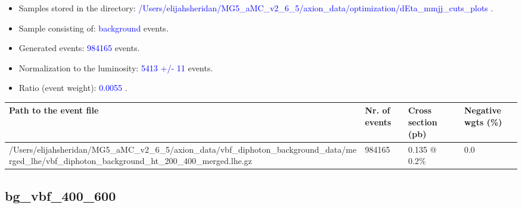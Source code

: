 \documentclass[a4paper, 10pt]{article}
\begin{document}
\begin{itemize}
  \item Samples stored in the directory: \textcolor{blue}{/\-Users/\-elijahsheridan/\-MG5\_aMC\_v2\_6\_5/\-axion\_data/\-optimization/\-dEta\_mmjj\_cuts\_plots} .
   \item Sample consisting of: \textcolor{blue}{background}  events.
   \item Generated events: \textcolor{blue}{984165 }  events.
   \item Normalization to the luminosity: \textcolor{blue}{5413}\textcolor{blue}{ +/\-- }\textcolor{blue}{11 }  events.
   \item Ratio (event weight): \textcolor{blue}{0.0055 } .  
 
\end{itemize}
\begin{table}[H]
  \begin{center}
    \begin{tabular}{|m{55.0mm}|m{25.0mm}|m{30.0mm}|m{30.0mm}|}
      \hline
      {\cellcolor{yellow}         Path to the event file}& {\cellcolor{yellow}         Nr. of events}& {\cellcolor{yellow}         Cross section (pb)}& {\cellcolor{yellow}         Negative wgts (\%)}\\
      \hline
      {\cellcolor{white}          /\-Users/\-elijahsheridan/\-MG5\_aMC\_v2\_6\_5/\-axion\_data/\-vbf\_diphoton\_background\_data/\-merged\_lhe/\-vbf\_diphoton\_background\_ht\_200\_400\_merged.lhe.gz}& {\cellcolor{white}          984165}& {\cellcolor{white}          0.135 @ 0.2\%}& {\cellcolor{white}          0.0}\\
\hline
    \end{tabular}
  \end{center}
\end{table}

\subsection{ bg\_vbf\_400\_600}
\end{document}
